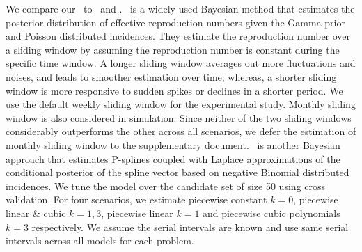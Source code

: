 We compare our \RtEstim\ to \EpiEstim\ and \EpiLPS. \EpiEstim\ is a widely used Bayesian method that estimates the posterior distribution of effective reproduction numbers given the Gamma prior and Poisson distributed incidences. They estimate the reproduction number over a sliding window by assuming the reproduction number is constant during the specific time window. A longer sliding window averages out more fluctuations and noises, and leads to smoother estimation over time; whereas, a shorter sliding window is more responsive to sudden spikes or declines in a shorter period. We use the default weekly sliding window for the experimental study. Monthly sliding window is also considered in simulation. Since neither of the two sliding windows considerably outperforms the other across all scenarios, we defer the estimation of monthly sliding window to the supplementary document. 
\EpiLPS\ is another Bayesian approach that estimates P-splines coupled with Laplace approximations of the conditional posterior of the spline vector based on negative Binomial distributed incidences. 
We tune the model over the candidate set of size 50 using cross validation. For four scenarios, we estimate piecewise constant $k=0$, piecewise linear \& cubic $k=1,3$, piecewise linear $k=1$ and piecewise cubic polynomials $k=3$ respectively. 
We assume the serial intervals are known and use same serial intervals across all models for each problem. 

